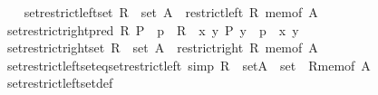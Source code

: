 \begin{isabellebody}
\ \ \isamarkupfalse%
\ {\isachardoublequoteopen}set{\isacharunderscore}{\kern0pt}restrict{\isacharunderscore}{\kern0pt}left{\isacharunderscore}{\kern0pt}set\ {\isacharparenleft}{\kern0pt}R\ {\isacharcolon}{\kern0pt}{\isacharcolon}{\kern0pt}\ set{\isacharparenright}{\kern0pt}\ A\ {\isasymequiv}\ restrict{\isacharunderscore}{\kern0pt}left\ R\ {\isacharparenleft}{\kern0pt}mem{\isacharunderscore}{\kern0pt}of\ A{\isacharparenright}{\kern0pt}{\isachardoublequoteclose}\isanewline
\ \ \isamarkupfalse%
\ {\isachardoublequoteopen}set{\isacharunderscore}{\kern0pt}restrict{\isacharunderscore}{\kern0pt}right{\isacharunderscore}{\kern0pt}pred\ R\ P\ {\isasymequiv}\ {\isacharbraceleft}{\kern0pt}p\ {\isasymin}\ R\ {\isacharbar}{\kern0pt}\ {\isasymexists}x\ y{\isachardot}{\kern0pt}\ P\ y\ {\isasymand}\ p\ {\isacharequal}{\kern0pt}\ {\isasymlangle}x{\isacharcomma}{\kern0pt}\ y{\isasymrangle}{\isacharbraceright}{\kern0pt}{\isachardoublequoteclose}\isanewline
\ \ \isamarkupfalse%
\ {\isachardoublequoteopen}set{\isacharunderscore}{\kern0pt}restrict{\isacharunderscore}{\kern0pt}right{\isacharunderscore}{\kern0pt}set\ {\isacharparenleft}{\kern0pt}R\ {\isacharcolon}{\kern0pt}{\isacharcolon}{\kern0pt}\ set{\isacharparenright}{\kern0pt}\ A\ {\isasymequiv}\ restrict{\isacharunderscore}{\kern0pt}right\ R\ {\isacharparenleft}{\kern0pt}mem{\isacharunderscore}{\kern0pt}of\ A{\isacharparenright}{\kern0pt}{\isachardoublequoteclose}\isanewline
{}\isamarkupfalse%
\isanewline
\isanewline
{}\isamarkupfalse%
\ set{\isacharunderscore}{\kern0pt}restrict{\isacharunderscore}{\kern0pt}left{\isacharunderscore}{\kern0pt}set{\isacharunderscore}{\kern0pt}eq{\isacharunderscore}{\kern0pt}set{\isacharunderscore}{\kern0pt}restrict{\isacharunderscore}{\kern0pt}left\ {\isacharbrackleft}{\kern0pt}simp{\isacharbrackright}{\kern0pt}{\isacharcolon}{\kern0pt}\ {\isachardoublequoteopen}{\isacharparenleft}{\kern0pt}R\ {\isacharcolon}{\kern0pt}{\isacharcolon}{\kern0pt}\ set{\isacharparenright}{\kern0pt}{\isasymrestriction}\isactrlbsub A\ {\isacharcolon}{\kern0pt}{\isacharcolon}{\kern0pt}\ set\isactrlesub \ {\isacharequal}{\kern0pt}\ R{\isasymrestriction}\isactrlbsub mem{\isacharunderscore}{\kern0pt}of\ A\isactrlesub {\isachardoublequoteclose}\isanewline
%
\isadelimproof
\ \ %
\endisadelimproof
%
\isatagproof
{}\isamarkupfalse%
\ set{\isacharunderscore}{\kern0pt}restrict{\isacharunderscore}{\kern0pt}left{\isacharunderscore}{\kern0pt}set{\isacharunderscore}{\kern0pt}def\ \isamarkupfalse%

\end{isabellebody}
